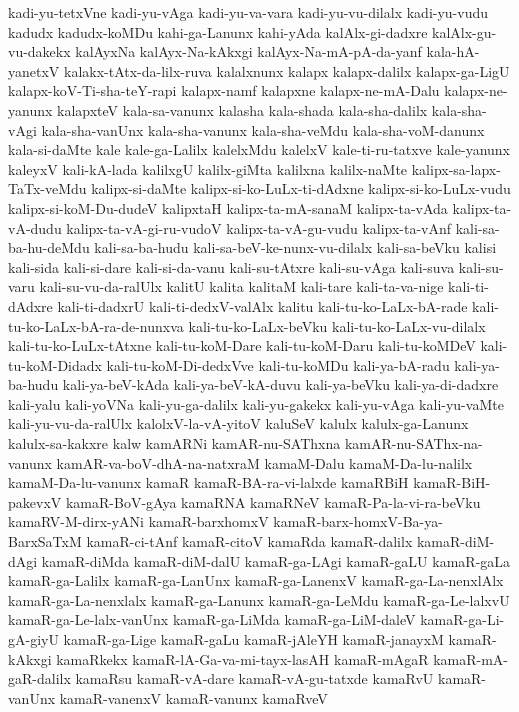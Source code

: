 {kadi-yu-tetxVne
kadi-yu-vAga
kadi-yu-va-vara
kadi-yu-vu-dilalx
kadi-yu-vudu
kadudx
kadudx-koMDu
kahi-ga-Lanunx
kahi-yAda
kalAlx-gi-dadxre
kalAlx-gu-vu-dakekx
kalAyxNa
kalAyx-Na-kAkxgi
kalAyx-Na-mA-pA-da-yanf
kala-hA-yanetxV
kalakx-tAtx-da-lilx-ruva
kalalxnunx
kalapx
kalapx-dalilx
kalapx-ga-LigU
kalapx-koV-Ti-sha-teY-rapi
kalapx-namf
kalapxne
kalapx-ne-mA-Dalu
kalapx-ne-yanunx
kalapxteV
kala-sa-vanunx
kalasha
kala-shada
kala-sha-dalilx
kala-sha-vAgi
kala-sha-vanUnx
kala-sha-vanunx
kala-sha-veMdu
kala-sha-voM-danunx
kala-si-daMte
kale
kale-ga-Lalilx
kalelxMdu
kalelxV
kale-ti-ru-tatxve
kale-yanunx
kaleyxV
kali-kA-lada
kalilxgU
kalilx-giMta
kalilxna
kalilx-naMte
kalipx-sa-lapx-TaTx-veMdu
kalipx-si-daMte
kalipx-si-ko-LuLx-ti-dAdxne
kalipx-si-ko-LuLx-vudu
kalipx-si-koM-Du-dudeV
kalipxtaH
kalipx-ta-mA-sanaM
kalipx-ta-vAda
kalipx-ta-vA-dudu
kalipx-ta-vA-gi-ru-vudoV
kalipx-ta-vA-gu-vudu
kalipx-ta-vAnf
kali-sa-ba-hu-deMdu
kali-sa-ba-hudu
kali-sa-beV-ke-nunx-vu-dilalx
kali-sa-beVku
kalisi
kali-sida
kali-si-dare
kali-si-da-vanu
kali-su-tAtxre
kali-su-vAga
kali-suva
kali-su-varu
kali-su-vu-da-ralUlx
kalitU
kalita
kalitaM
kali-tare
kali-ta-va-nige
kali-ti-dAdxre
kali-ti-dadxrU
kali-ti-dedxV-valAlx
kalitu
kali-tu-ko-LaLx-bA-rade
kali-tu-ko-LaLx-bA-ra-de-nunxva
kali-tu-ko-LaLx-beVku
kali-tu-ko-LaLx-vu-dilalx
kali-tu-ko-LuLx-tAtxne
kali-tu-koM-Dare
kali-tu-koM-Daru
kali-tu-koMDeV
kali-tu-koM-Didadx
kali-tu-koM-Di-dedxVve
kali-tu-koMDu
kali-ya-bA-radu
kali-ya-ba-hudu
kali-ya-beV-kAda
kali-ya-beV-kA-duvu
kali-ya-beVku
kali-ya-di-dadxre
kali-yalu
kali-yoVNa
kali-yu-ga-dalilx
kali-yu-gakekx
kali-yu-vAga
kali-yu-vaMte
kali-yu-vu-da-ralUlx
kalolxV-la-vA-yitoV
kaluSeV
kalulx
kalulx-ga-Lanunx
kalulx-sa-kakxre
kalw
kamARNi
kamAR-nu-SAThxna
kamAR-nu-SAThx-na-vanunx
kamAR-va-boV-dhA-na-natxraM
kamaM-Dalu
kamaM-Da-lu-nalilx
kamaM-Da-lu-vanunx
kamaR
kamaR-BA-ra-vi-lalxde
kamaRBiH
kamaR-BiH-pakevxV
kamaR-BoV-gAya
kamaRNA
kamaRNeV
kamaR-Pa-la-vi-ra-beVku
kamaRV-M-dirx-yANi
kamaR-barxhomxV
kamaR-barx-homxV-Ba-ya-BarxSaTxM
kamaR-ci-tAnf
kamaR-citoV
kamaRda
kamaR-dalilx
kamaR-diM-dAgi
kamaR-diMda
kamaR-diM-dalU
kamaR-ga-LAgi
kamaR-gaLU
kamaR-gaLa
kamaR-ga-Lalilx
kamaR-ga-LanUnx
kamaR-ga-LanenxV
kamaR-ga-La-nenxlAlx
kamaR-ga-La-nenxlalx
kamaR-ga-Lanunx
kamaR-ga-LeMdu
kamaR-ga-Le-lalxvU
kamaR-ga-Le-lalx-vanUnx
kamaR-ga-LiMda
kamaR-ga-LiM-daleV
kamaR-ga-Li-gA-giyU
kamaR-ga-Lige
kamaR-gaLu
kamaR-jAleYH
kamaR-janayxM
kamaR-kAkxgi
kamaRkekx
kamaR-lA-Ga-va-mi-tayx-lasAH
kamaR-mAgaR
kamaR-mA-gaR-dalilx
kamaRsu
kamaR-vA-dare
kamaR-vA-gu-tatxde
kamaRvU
kamaR-vanUnx
kamaR-vanenxV
kamaR-vanunx
kamaRveV
}
